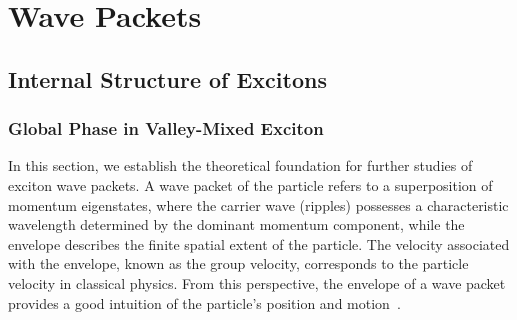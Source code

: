 \chapter{Wave Packets}
\label{ch:method2}

\section{Internal Structure of Excitons}
\subsection{Global Phase in Valley-Mixed Exciton}
In this section, we establish the theoretical foundation for further studies of exciton wave packets. A wave packet of the particle refers to a superposition of momentum eigenstates, where the carrier wave (ripples) possesses a characteristic wavelength determined by the dominant momentum component, while the envelope describes the finite spatial extent of the particle. The velocity associated with the envelope, known as the group velocity, corresponds to the particle velocity in classical physics. From this perspective, the envelope of a wave packet provides a good intuition of the particle's position and motion~\cite{griffiths2018introduction, mcintyre2012quantum}.

